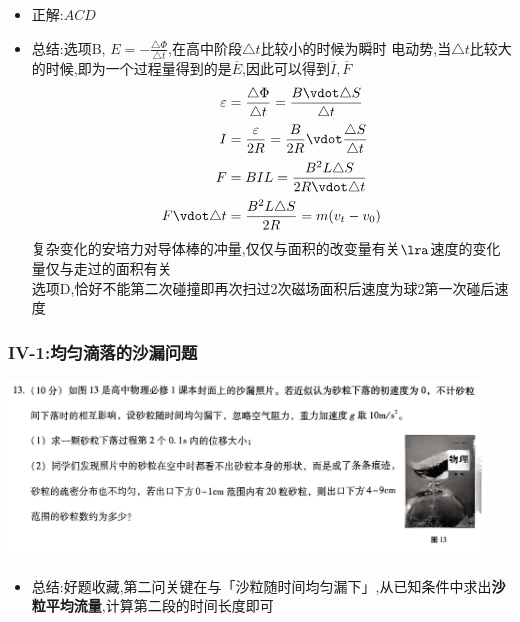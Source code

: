 \documentclass{article}
\begin{document}
\begin{itemize}
    \item 正解:\quad $ACD$
    \item 总结:\quad 选项B, $E = - \frac{\triangle \Phi}{\triangle t}$,在高中阶段$\triangle t$比较小的时候为瞬时
          电动势,当$\triangle t$比较大的时候,即为一个过程量得到的是$\overline{E}$,因此可以得到$\overline{I},\overline{F}$
          \begin{align*}
              \varepsilon         & = \frac{\triangle \Phi}{\triangle t} = \frac{B \vdot \triangle S}{\triangle t} \\
              I                   & = \frac{\varepsilon}{2R} = \frac{B}{2R} \vdot \frac{\triangle S}{\triangle t}  \\
              F                   & = B I L = \frac{B^{2}L \triangle S}{2R \vdot \triangle t}                      \\
              F \vdot \triangle t & = \frac{B^{2} L \triangle S}{2 R} = m(v_{t} - v_{0})
          \end{align*}
          复杂变化的安培力对导体棒的冲量,仅仅与面积的改变量有关$\lra$速度的变化量仅与走过的面积有关 \\
          选项D,恰好不能第二次碰撞即再次扫过2次磁场面积后速度为球2第一次碰后速度
\end{itemize}

\vspace{2em}

\subsubsection{IV-1:均匀滴落的沙漏问题}
\includegraphics[width=0.95\textwidth,keepaspectratio]{./pictures/3.1-4.png}

\begin{itemize}
    \item 总结:好题收藏,第二问关键在与「沙粒随时间均匀漏下」,从已知条件中求出\textbf{沙粒平均流量},计算第二段的时间长度即可
\end{itemize}
\end{document}
